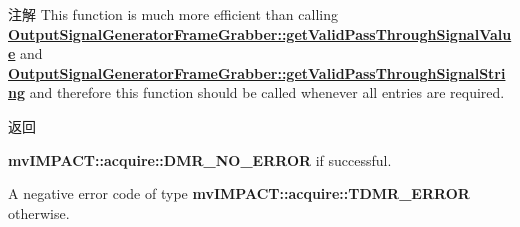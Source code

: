 \begin{DoxyNote}{注解}
This function is much more efficient than calling {\bfseries \hyperlink{classmv_i_m_p_a_c_t_1_1acquire_1_1_output_signal_generator_frame_grabber_a79f2053c88997435f48804ed0ec3598c}{Output\+Signal\+Generator\+Frame\+Grabber\+::get\+Valid\+Pass\+Through\+Signal\+Value}} and {\bfseries \hyperlink{classmv_i_m_p_a_c_t_1_1acquire_1_1_output_signal_generator_frame_grabber_a9cebc24507b191a912c916a6b1d3b845}{Output\+Signal\+Generator\+Frame\+Grabber\+::get\+Valid\+Pass\+Through\+Signal\+String}} and therefore this function should be called whenever all entries are required.
\end{DoxyNote}
\begin{DoxyReturn}{返回}

\begin{DoxyItemize}
\item {\bfseries mv\+I\+M\+P\+A\+C\+T\+::acquire\+::\+D\+M\+R\+\_\+\+N\+O\+\_\+\+E\+R\+R\+O\+R} if successful.
\item A negative error code of type {\bfseries mv\+I\+M\+P\+A\+C\+T\+::acquire\+::\+T\+D\+M\+R\+\_\+\+E\+R\+R\+O\+R} otherwise. 
\end{DoxyItemize}
\end{DoxyReturn}

